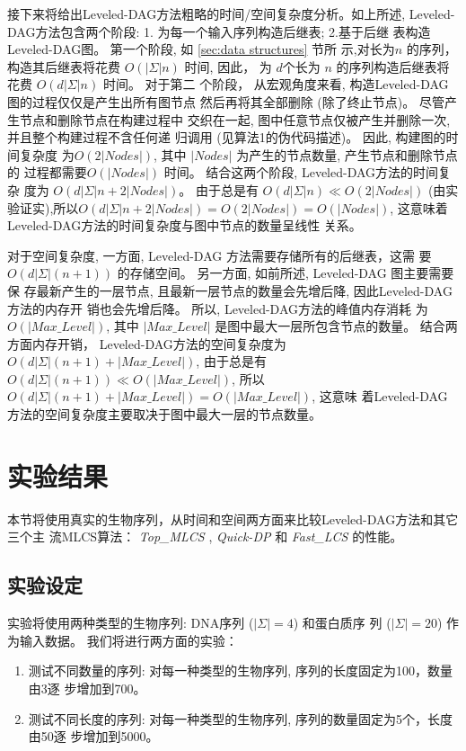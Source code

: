 接下来将给出Leveled-DAG方法粗略的时间/空间复杂度分析。如上所述,
Leveled-DAG方法包含两个阶段: 1. 为每一个输入序列构造后继表; 2.基于后继
表构造Leveled-DAG图。 第一个阶段, 如 \ref{sec:data structures} 节所
示,对长为$n$ 的序列，构造其后继表将花费 $O(|\Sigma|n)$ 时间, 因此，
为 $d$个长为 $n$ 的序列构造后继表将花费 $O(d|\Sigma|n)$ 时间。 对于第二
个阶段， 从宏观角度来看, 构造Leveled-DAG 图的过程仅仅是产生出所有图节点
然后再将其全部删除 (除了终止节点)。 尽管产生节点和删除节点在构建过程中
交织在一起, 图中任意节点仅被产生并删除一次, 并且整个构建过程不含任何递
归调用 (见算法1的伪代码描述)。 因此, 构建图的时间复杂度
为$O(2|Nodes|)$, 其中 $|Nodes|$ 为产生的节点数量, 产生节点和删除节点的
过程都需要$O(|Nodes|)$ 时间。 结合这两个阶段, Leveled-DAG方法的时间复杂
度为 $O(d|\Sigma|n + 2|Nodes|)$。 由于总是有 $O(d|\Sigma|n) \ll
O(2|Nodes|)$
(由实验证实),所以$O(d|\Sigma|n + 2|Nodes|) = O(2|Nodes|) =
O(|Nodes|)$, 这意味着Leveled-DAG方法的时间复杂度与图中节点的数量呈线性
关系。

对于空间复杂度, 一方面, Leveled-DAG 方法需要存储所有的后继表，这需
要 $O(d|\Sigma|(n+1))$ 的存储空间。 另一方面, 如前所述, Leveled-DAG 图主要需要保
存最新产生的一层节点, 且最新一层节点的数量会先增后降, 因此Leveled-DAG方法的内存开
销也会先增后降。 所以, Leveled-DAG方法的峰值内存消耗
为 $O(|Max\_Level|)$, 其中 $|Max\_Level|$ 是图中最大一层所包含节点的数量。 结合两
方面内存开销， Leveled-DAG方法的空间复杂度为 $O(d|\Sigma|(n+1) + |Max\_Level|)$,
由于总是有 $O(d|\Sigma|(n+1)) \ll O(|Max\_Level|)$, 所以
$O(d|\Sigma|(n+1) + |Max\_Level|) = O(|Max\_Level|)$, 这意味
着Leveled-DAG方法的空间复杂度主要取决于图中最大一层的节点数量。


\section{实验结果}
\label{sec:4_experiments}

本节将使用真实的生物序列，从时间和空间两方面来比较Leveled-DAG方法和其它三个主
流MLCS算法： \emph{Top\_MLCS} \cite{Li2016_ICDE}, \emph{Quick-DP}
\cite{Wang2011} 和 \emph{Fast\_LCS} \cite{Chen2006} 的性能。

\subsection{实验设定}
\label{Test problems}

实验将使用两种类型的生物序列: DNA序列 ($|\Sigma|=4$) 和蛋白质序
列 ($|\Sigma|=20$) 作为输入数据。 我们将进行两方面的实验：

\begin{enumerate}
\item 测试不同数量的序列: 对每一种类型的生物序列, 序列的长度固定为100，数量由3逐
  步增加到700。
\item 测试不同长度的序列: 对每一种类型的生物序列, 序列的数量固定为5个，长度由50逐
  步增加到5000。
\end{enumerate}

